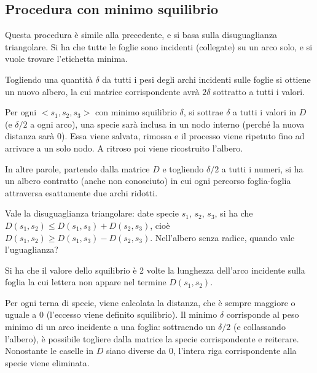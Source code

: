 \subsection{Procedura con minimo squilibrio}
Questa procedura è simile alla precedente, e si basa sulla disuguaglianza triangolare. Si ha che tutte le foglie sono incidenti (collegate) su un arco solo, e si vuole trovare l'etichetta minima.

Togliendo una quantità $\delta$ da tutti i pesi degli archi incidenti sulle foglie si ottiene un nuovo albero, la cui matrice corrispondente avrà $2\delta$ sottratto a tutti i valori.

Per ogni $<s_1, s_2, s_3>$ con minimo squilibrio $\delta$, si sottrae $\delta$ a tutti i valori in $D$ (e $\delta/2$ a ogni arco), una specie sarà inclusa in un nodo interno (perché la nuova distanza sarà 0). Essa viene salvata, rimossa e il processo viene ripetuto fino ad arrivare a un solo nodo. A ritroso poi viene ricostruito l'albero. 

In altre parole, partendo dalla matrice $D$ e togliendo $\delta/2$ a tutti i numeri, si ha un albero contratto (anche non conosciuto) in cui ogni percorso foglia-foglia attraversa esattamente due archi ridotti. 

Vale la disuguaglianza triangolare: date specie $s_1$, $s_2$, $s_3$, si ha che $D(s_1, s_2) \leq D(s_1, s_3) + D(s_2, s_3)$, cioè $D(s_1, s_2) \geq D(s_1, s_3) - D(s_2, s_3)$. Nell'albero senza radice, quando vale l'uguaglianza?

Si ha che il valore dello squilibrio è 2 volte la lunghezza dell'arco incidente sulla foglia la cui lettera non appare nel termine $D(s_1, s_2)$.

Per ogni terna di specie, viene calcolata la distanza, che è sempre maggiore o uguale a 0 (l'eccesso viene definito squilibrio). Il minimo $\delta$ corrisponde al peso minimo di un arco incidente a una foglia: sottraendo un $\delta/2$ (e collassando l'albero), è possibile togliere dalla matrice la specie corrispondente e reiterare. Nonostante le caselle in $D$ siano diverse da 0, l'intera riga corrispondente alla specie viene eliminata.

